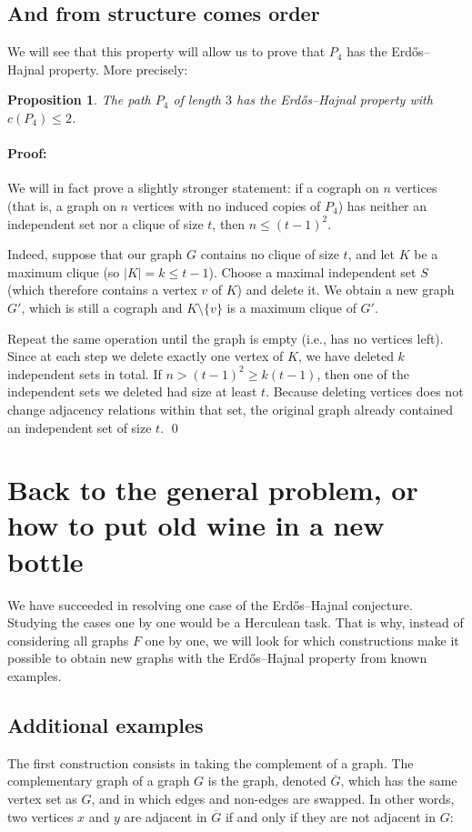 \documentclass{amsart}
\newtheorem*{proposition}{Proposition}
\begin{document}
\subsection{And from structure comes order}
We will see that this property will allow us to prove that $P_{4}$ has
the Erd\H os--Hajnal property. More precisely:
\begin{proposition}\mbox{}\hspace{-0.7ex}%
  The path $P_{4}$ of length $3$ has the Erd\H os--Hajnal property
  with $c(P_{4})\leq2$.
\end{proposition}
\paragraph{Proof:}
We will in fact prove a slightly stronger statement: if a cograph on
$n$ vertices (that is, a graph on $n$ vertices with no induced copies
of $P_{4}$) has neither an independent set nor a clique of size $t$,
then $n\leq(t-1)^{2}$. 

Indeed, suppose that our graph $G$ contains no clique of size $t$, and
let $K$ be a maximum clique (so $|K|=k\leq t-1$). Choose a maximal
independent set $S$ (which therefore contains a vertex $v$ of $K$) and
delete it.  We obtain a new graph $G'$, which is still a cograph and
$K\setminus\{v\}$ is a maximum clique of $G'$.

Repeat the same operation until the graph is empty (i.e., has no
vertices left). Since at each step we delete exactly one vertex of $K$,
we have deleted $k$ independent sets in total. If
$n>(t-1)^{2}\geq k(t-1)$, then one of the independent sets we deleted
had size at least $t$. Because deleting vertices does not change
adjacency relations within that set, the original graph already
contained an independent set of size $t$.  \hfill\qed

\section{Back to the general problem, or how to put old wine in a new bottle}
We have succeeded in resolving one case of the Erd\H os--Hajnal
conjecture. Studying the cases one by one would be a Herculean
task. That is why, instead of considering all graphs $F$ one by one, we
will look for which constructions make it possible to obtain new
graphs with the Erd\H os--Hajnal property from known examples.

\let\bar=\overline
\subsection{Additional examples}
The first construction consists in taking the complement of a graph.
The complementary graph of a graph $G$ is the graph, denoted $\bar G$,
which has the same vertex set as $G$, and in which edges and non-edges
are swapped.  In other words, two vertices $x$ and $y$ are adjacent in
$\bar G$ if and only if they are not adjacent in $G$:
\medskip
\end{document}
